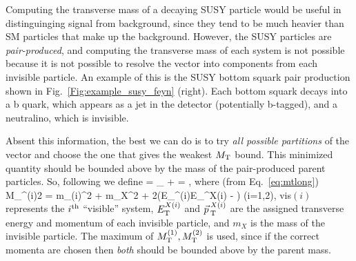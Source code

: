 Computing the transverse mass of a decaying SUSY particle would be useful in distinguinging signal from background, since they tend to be much heavier than
SM particles that make up the background. However, the SUSY particles are \emph{pair-produced}, and computing the transverse mass 
of each system is not possible because it is not possible to resolve the \vMet vector into components from
each invisible particle. An example of this is the SUSY bottom squark pair production shown in 
Fig.~\ref{Fig:example_susy_feyn} (right). Each bottom squark decays into a b quark, which appears
as a jet in the detector (potentially b-tagged), and a neutralino, which is invisible.

Absent this information, the best we can do is to try \emph{all possible partitions} of the \vMet vector
and choose the one that gives the weakest $M_{\mathrm{T}}$ bound. This minimized quantity should be bounded above
by the mass of the pair-produced parent particles.
So, following \cite{mt2_def} we define
\be
\mttwo = \min_{ +  = \vMet}
,
\ee
where (from Eq.~\ref{eq:mtlong})
\be\label{eq:mti}
M_^{(i)2} = m_{(i)}^2 + m_X^2 + 
2\left(E_^{(i)}E_^{X(i)} - \cdot{}\right)
\;\;(i=1,2),
\ee
vis$(i)$ represents the $i^{\mathrm{th}}$ ``visible'' system, $E_{\mathrm{T}}^{X(i)}$ and $\vec{p}_{\> \mathrm{T}}^{\> X(i)}$ are the assigned transverse energy and momentum of each invisible particle, 
and $m_X$ is the mass of the invisible particle. The maximum of $M_{\mathrm{T}}^{(1)},M_{\mathrm{T}}^{(2)}$ is used, since if
the correct momenta are chosen then \emph{both} should be bounded above by the parent mass.

